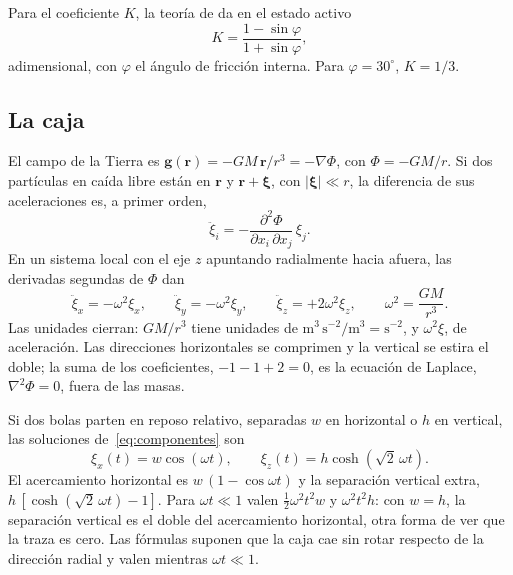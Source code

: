 \documentclass[11pt,a4paper]{article}
\begin{document}
Para el coeficiente $K$, la teoría de \textcite{rankine1857} da en el estado activo
\begin{equation}\label{eq:rankine}
K = \frac{1 - \sin\varphi}{1 + \sin\varphi},
\end{equation}
adimensional, con $\varphi$ el ángulo de fricción interna. Para $\varphi = 30^\circ$, $K = 1/3$.

\subsection{La caja}\label{sec:caja}

El campo de la Tierra es $\mathbf{g}(\mathbf{r}) = -GM\,\mathbf{r}/r^3 = -\nabla\Phi$, con $\Phi = -GM/r$. Si dos partículas en caída libre están en $\mathbf{r}$ y $\mathbf{r} + \boldsymbol{\xi}$, con $|\boldsymbol{\xi}| \ll r$, la diferencia de sus aceleraciones es, a primer orden,
\begin{equation}\label{eq:marea}
\ddot\xi_i = -\frac{\partial^2 \Phi}{\partial x_i\,\partial x_j}\,\xi_j .
\end{equation}
En un sistema local con el eje $z$ apuntando radialmente hacia afuera, las derivadas segundas de $\Phi$ dan
\begin{equation}\label{eq:componentes}
\ddot\xi_x = -\omega^2 \xi_x, \qquad \ddot\xi_y = -\omega^2 \xi_y, \qquad \ddot\xi_z = +2\omega^2 \xi_z, \qquad \omega^2 = \frac{GM}{r^3}.
\end{equation}
Las unidades cierran: $GM/r^3$ tiene unidades de $\mathrm{m^3\,s^{-2}/m^3} = \mathrm{s^{-2}}$, y $\omega^2\xi$, de aceleración. Las direcciones horizontales se comprimen y la vertical se estira el doble; la suma de los coeficientes, $-1-1+2 = 0$, es la ecuación de Laplace, $\nabla^2\Phi = 0$, fuera de las masas.

Si dos bolas parten en reposo relativo, separadas $w$ en horizontal o $h$ en vertical, las soluciones de~\eqref{eq:componentes} son
\begin{equation}\label{eq:soluciones}
\xi_x(t) = w \cos(\omega t), \qquad \xi_z(t) = h \cosh\!\left(\sqrt2\,\omega t\right).
\end{equation}
El acercamiento horizontal es $w\,(1 - \cos\omega t)$ y la separación vertical extra, $h\,[\cosh(\sqrt2\,\omega t) - 1]$. Para $\omega t \ll 1$ valen $\tfrac12 \omega^2 t^2 w$ y $\omega^2 t^2 h$: con $w = h$, la separación vertical es el doble del acercamiento horizontal, otra forma de ver que la traza es cero. Las fórmulas suponen que la caja cae sin rotar respecto de la dirección radial y valen mientras $\omega t \ll 1$.
\end{document}
